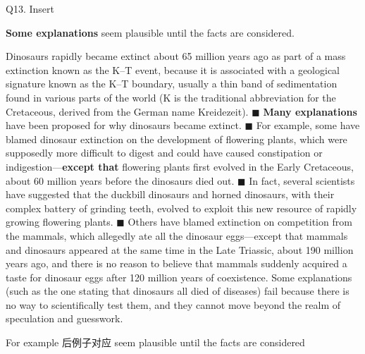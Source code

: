 \begin{blk}
    \begin{qst}
        Q13. Insert

        \textbf{Some explanations} seem plausible until the facts are considered.
    \end{qst}

    \begin{psgq}
        Dinosaurs rapidly became extinct about 65 million years ago as part of a mass extinction known as the K–T event, because it is associated with a geological signature known as the K–T boundary, usually a thin band of sedimentation found in various parts of the world (K is the traditional abbreviation for the Cretaceous, derived from the German name Kreidezeit). $\blacksquare$ \textbf{Many explanations} have been proposed for why dinosaurs became extinct. $\blacksquare$ For example, some have blamed dinosaur extinction on the development of flowering plants, which were supposedly more difficult to digest and could have caused constipation or indigestion—\textbf{except that} flowering plants first evolved in the Early Cretaceous, about 60 million years before the dinosaurs died out. $\blacksquare$ In fact, several scientists have suggested that the duckbill dinosaurs and horned dinosaurs, with their complex battery of grinding teeth, evolved to exploit this new resource of rapidly growing flowering plants. $\blacksquare$ Others have blamed extinction on competition from the mammals, which allegedly ate all the dinosaur eggs—except that mammals and dinosaurs appeared at the same time in the Late Triassic, about 190 million years ago, and there is no reason to believe that mammals suddenly acquired a taste for dinosaur eggs after 120 million years of coexistence. Some explanations (such as the one stating that dinosaurs all died of diseases) fail because there is no way to scientifically test them, and they cannot move beyond the realm of speculation and guesswork.
    \end{psgq}

    \begin{nlz}
        For example 后例子对应 seem plausible until the facts are considered
    \end{nlz}
\end{blk}
